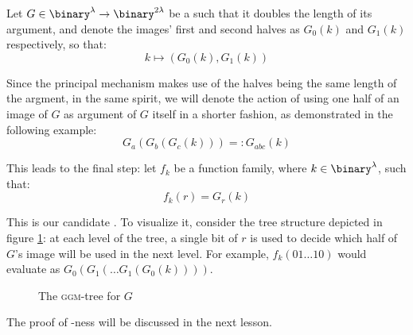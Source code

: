 \begin{construction}
    Let $G \in \binary^\lambda \to \binary^{2\lambda}$ be a \prg{} such that it doubles the length of its argument, and denote the images' first and second halves as $G_0(k)$ and $G_1(k)$ respectively, so that: 
    \[
        k \mapsto (G_0(k), G_1(k))
    \]

    Since the principal mechanism makes use of the halves being the same length of the argment, in the same spirit, we will denote the action of using one half of an image of $G$ as argument of $G$ itself in a shorter fashion, as demonstrated in the following example:
    \[
        G_a(G_b(G_c(k))) =: G_{abc}(k)
    \]

    This leads to the final step: let $f_k$ be a function family, where $k \in \binary^\lambda$, such that:
    \[
        f_k(r) = G_r(k)
    \]

    This is our candidate \prf. To visualize it, consider the tree structure depicted in figure \ref{fig:ggmtree}: at each level of the tree, a single bit of $r$ is used to decide which half of $G$'s image will be used in the next level. For example, $f_k(01 \dots 10)$ would evaluate as $G_0(G_1( \dots G_1(G_0(k))))$.

    \begin{figure}
        \centering
        \caption{The \textsc{ggm}-tree for $G$}
        \label{fig:ggmtree}
    \end{figure}

\end{construction}

The proof of \prf-ness will be discussed in the next lesson.
